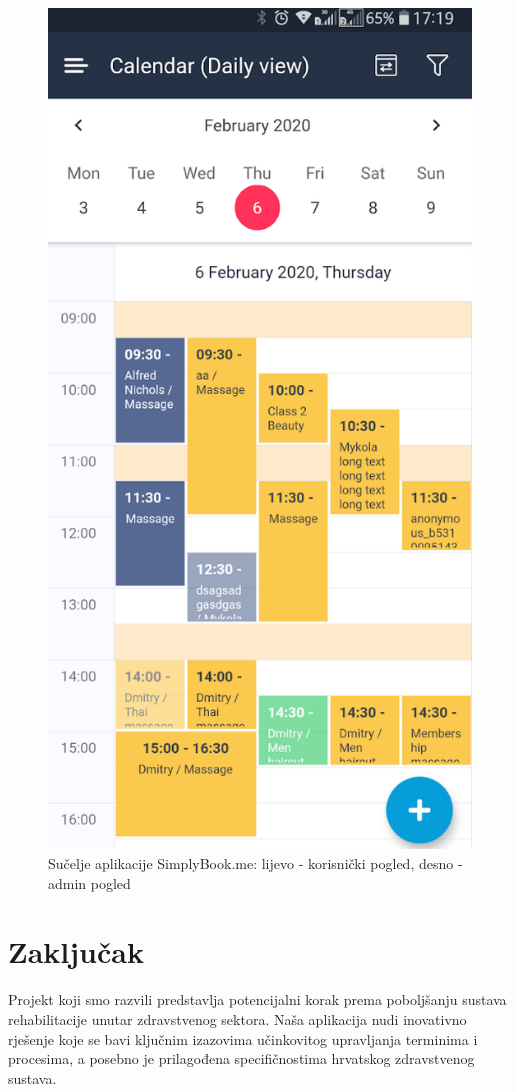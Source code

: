 \begin{itemize}
\begin{itemize}
\begin{figure}[!h]
                            \includegraphics[width=0.45\linewidth]{slike/simplybook-admin.png}
                            \caption{Sučelje aplikacije SimplyBook.me: lijevo - korisnički pogled, desno - admin pogled}
                        \end{figure}
                        \FloatBarrier

                    \end{itemize}

                \end{itemize}


        
  
		\section*{Zaključak}

        Projekt koji smo razvili predstavlja potencijalni korak prema poboljšanju sustava rehabilitacije unutar zdravstvenog sektora. Naša aplikacija nudi inovativno rješenje koje se bavi ključnim izazovima učinkovitog upravljanja terminima i procesima, a posebno je prilagođena specifičnostima hrvatskog zdravstvenog sustava.
        
